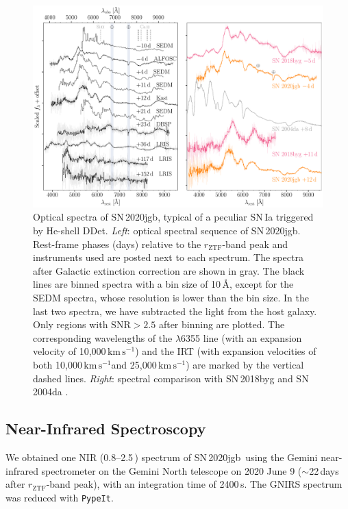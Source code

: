 \documentclass[twocolumn]{aastex631}
\newcommand{\sn}{SN\,2020jgb}
\newcommand{\kms}{$\mathrm{km}\,\mathrm{s}^{-1}$}
\begin{document}

\begin{figure}
    \centering
    \includegraphics[width=\textwidth]{optical_spec_evolution.pdf}
    \caption{Optical spectra of \sn, typical of a peculiar SN\,Ia triggered by He-shell DDet. \textit{Left}: optical spectral sequence of \sn. Rest-frame phases (days) relative to the $r_\mathrm{ZTF}$-band peak and instruments used are posted next to each spectrum. The spectra after Galactic extinction correction are shown in gray. The black lines are binned spectra with a bin size of 10\,\AA, except for the SEDM spectra, whose resolution is lower than the bin size. In the last two spectra, we have subtracted the light from the host galaxy. Only regions with $\mathrm{SNR}>2.5$ after binning are plotted. The corresponding wavelengths of the  $\lambda$6355 line (with an expansion velocity of 10,000\,\kms) and the  IRT (with expansion velocities of both 10,000\,\kms and 25,000\,\kms) are marked by the vertical dashed lines.
    \textit{Right}: spectral comparison with SN\,2018byg \citep[subluminous He-shell DDet;][]{de_18byg_2019} and SN\,2004da \citep[normal luminosity;][]{Silverman_2012}.}
    \label{fig:spec_evo}
\end{figure}

\subsection{Near-Infrared Spectroscopy}
We obtained one NIR (0.8--2.5\,\micron) spectrum of \sn\ using the Gemini near-infrared spectrometer \citep[GNIRS;][]{GNIRS1998} on the Gemini North telescope on 2020 June 9 ($\sim$22\,days after $r_\mathrm{ZTF}$-band peak), with an integration time of 2400\,s. The GNIRS spectrum was reduced with \texttt{PypeIt}.
\end{document}
